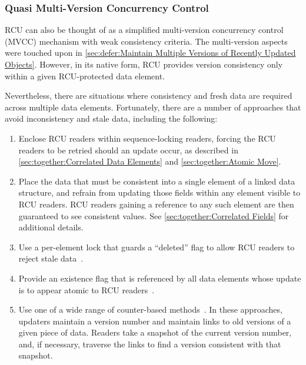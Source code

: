 \subsubsection{Quasi Multi-Version Concurrency Control}
\label{sec:defer:Quasi Multi-Version Concurrency Control}

RCU can also be thought of as a simplified multi-version concurrency
control (MVCC) mechanism with weak consistency criteria.
The multi-version aspects were touched upon in
\cref{sec:defer:Maintain Multiple Versions of Recently Updated Objects}.
However, in its native form, RCU provides version consistency only
within a given RCU-protected data element.

Nevertheless, there are situations where consistency and fresh data are
required across multiple data elements.
Fortunately, there are a number of approaches that avoid inconsistency
and stale data, including the following:

\begin{enumerate}
\item	Enclose RCU readers within sequence-locking readers, forcing
	the RCU readers to be retried should an update occur,
	as described in
	\cref{sec:together:Correlated Data Elements}
	and
	\cref{sec:together:Atomic Move}.
\item	Place the data that must be consistent into a single element
	of a linked data structure, and refrain from updating those
	fields within any element visible to RCU readers.
	RCU readers gaining a reference to any such element are then
	guaranteed to see consistent values.
	See \cref{sec:together:Correlated Fields} for additional details.
\item	Use a per-element lock that guards a ``deleted'' flag to allow
	RCU readers to reject stale
	data~\cite{PaulEdwardMcKenneyPhD,Arcangeli03}.
\item	Provide an existence flag that is referenced by all data elements
	whose update is to appear atomic to RCU
	readers~\cite{PaulEMcKennneyAtomicTreeN4037,PaulEMcKennneyAtomicTreeCPPCON2014,PaulEMcKenneyIssaquahUpdate2015,PaulEMcKenney2016IssaquahACMApp,PaulEMcKenney2016IssaquahCPPCON}.
\item	Use one of a wide range of counter-based
	methods~\cite{PaulEMcKenney2008cyclicRCU,PaulEMcKenney2010cyclicRCU,PaulEMcKenney2011cyclicparallelRCU,PaulEMcKenney2014cyclicRCU,Matveev:2015:RLS:2815400.2815406,Kim:2019:MSR:3297858.3304040}.
	In these approaches, updaters maintain a version number and maintain links
	to old versions of a given piece of data.
	Readers take a snapshot of the current version number, and, if necessary,
	traverse the links to find a version consistent with that snapshot.
\end{enumerate}


